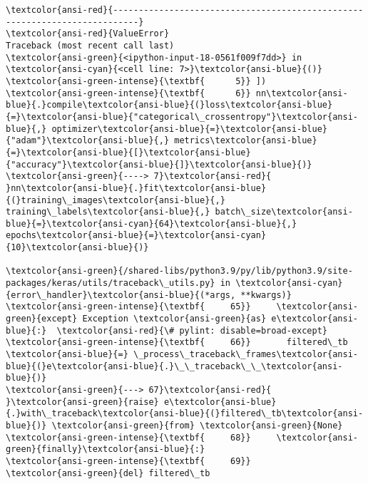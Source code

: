 \documentclass[12pt,a4paper,table]{article}
\begin{document}
    \begin{Verbatim}[commandchars=\\\{\}, frame=single, framerule=2mm, rulecolor=\color{outerrorbackground}]
\textcolor{ansi-red}{---------------------------------------------------------------------------}
\textcolor{ansi-red}{ValueError}                                Traceback (most recent call last)
\textcolor{ansi-green}{<ipython-input-18-0561f009f7dd>} in \textcolor{ansi-cyan}{<cell line: 7>}\textcolor{ansi-blue}{()}
\textcolor{ansi-green-intense}{\textbf{      5}} ])
\textcolor{ansi-green-intense}{\textbf{      6}} nn\textcolor{ansi-blue}{.}compile\textcolor{ansi-blue}{(}loss\textcolor{ansi-blue}{=}\textcolor{ansi-blue}{"categorical\_crossentropy"}\textcolor{ansi-blue}{,} optimizer\textcolor{ansi-blue}{=}\textcolor{ansi-blue}{"adam"}\textcolor{ansi-blue}{,} metrics\textcolor{ansi-blue}{=}\textcolor{ansi-blue}{[}\textcolor{ansi-blue}{"accuracy"}\textcolor{ansi-blue}{]}\textcolor{ansi-blue}{)}
\textcolor{ansi-green}{----> 7}\textcolor{ansi-red}{ }nn\textcolor{ansi-blue}{.}fit\textcolor{ansi-blue}{(}training\_images\textcolor{ansi-blue}{,} training\_labels\textcolor{ansi-blue}{,} batch\_size\textcolor{ansi-blue}{=}\textcolor{ansi-cyan}{64}\textcolor{ansi-blue}{,} epochs\textcolor{ansi-blue}{=}\textcolor{ansi-cyan}{10}\textcolor{ansi-blue}{)}

\textcolor{ansi-green}{/shared-libs/python3.9/py/lib/python3.9/site-packages/keras/utils/traceback\_utils.py} in \textcolor{ansi-cyan}{error\_handler}\textcolor{ansi-blue}{(*args, **kwargs)}
\textcolor{ansi-green-intense}{\textbf{     65}}     \textcolor{ansi-green}{except} Exception \textcolor{ansi-green}{as} e\textcolor{ansi-blue}{:}  \textcolor{ansi-red}{\# pylint: disable=broad-except}
\textcolor{ansi-green-intense}{\textbf{     66}}       filtered\_tb \textcolor{ansi-blue}{=} \_process\_traceback\_frames\textcolor{ansi-blue}{(}e\textcolor{ansi-blue}{.}\_\_traceback\_\_\textcolor{ansi-blue}{)}
\textcolor{ansi-green}{---> 67}\textcolor{ansi-red}{       }\textcolor{ansi-green}{raise} e\textcolor{ansi-blue}{.}with\_traceback\textcolor{ansi-blue}{(}filtered\_tb\textcolor{ansi-blue}{)} \textcolor{ansi-green}{from} \textcolor{ansi-green}{None}
\textcolor{ansi-green-intense}{\textbf{     68}}     \textcolor{ansi-green}{finally}\textcolor{ansi-blue}{:}
\textcolor{ansi-green-intense}{\textbf{     69}}       \textcolor{ansi-green}{del} filtered\_tb


\end{Verbatim}
\end{document}
